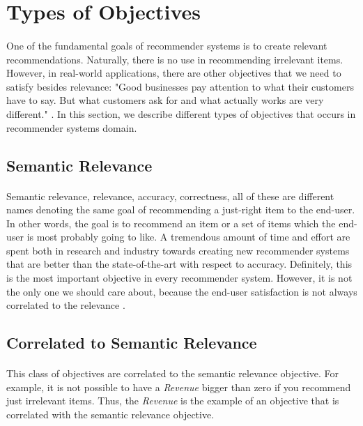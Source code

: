 \documentclass[letterpaper]{article}
\begin{document}
\section{Types of Objectives}
\label{sec:objectives}
\paragraph{}

One of the fundamental goals of recommender systems is to create relevant recommendations. Naturally, there is no use in recommending irrelevant items. However, in real-world applications, there are other objectives that we need to satisfy besides relevance: "Good businesses pay attention to what their customers have to say. But what customers ask for and what actually works are very different." \cite{Gomez-Uribe:2015:NRS:2869770.2843948}. In this section, we describe different types of objectives that occurs in recommender systems domain.

\subsection{Semantic Relevance}
\paragraph{}

Semantic relevance, relevance, accuracy, correctness, all of these are different names denoting the same goal of recommending a just-right item to the end-user. In other words, the goal is to recommend an item or a set of items which the end-user is most probably going to like. A tremendous amount of time and effort are spent both in research and industry towards creating new recommender systems that are better than the state-of-the-art with respect to accuracy. Definitely, this is the most important objective in every recommender system. However, it is not the only one we should care about, because the end-user satisfaction is not always correlated to the relevance \cite{Being_Accurate_not_enough}.

\subsection{Correlated to Semantic Relevance}
\paragraph{}

This class of objectives are correlated to the semantic relevance objective. For example, it is not possible to have a \textit{Revenue} bigger than zero if you recommend just irrelevant items. Thus, the \textit{Revenue} is the example of an objective that is correlated with the semantic relevance objective.
\end{document}

